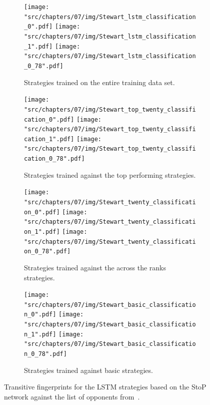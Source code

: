 \begin{figure}[!htbp]
    \begin{subfigure}{\textwidth}
        \texttt{[image: "src/chapters/07/img/Stewart\_lstm\_classification\_0".pdf]}
        \texttt{[image: "src/chapters/07/img/Stewart\_lstm\_classification\_1".pdf]}
        \texttt{[image: "src/chapters/07/img/Stewart\_lstm\_classification\_0\_78".pdf]}
        \caption{Strategies trained on the entire training data set.}
    \end{subfigure}
    \begin{subfigure}{\textwidth}
        \texttt{[image: "src/chapters/07/img/Stewart\_top\_twenty\_classification\_0".pdf]}
        \texttt{[image: "src/chapters/07/img/Stewart\_top\_twenty\_classification\_1".pdf]}
        \texttt{[image: "src/chapters/07/img/Stewart\_top\_twenty\_classification\_0\_78".pdf]}
        \caption{Strategies trained against the top performing strategies.}
    \end{subfigure}
    \begin{subfigure}{\textwidth}
        \texttt{[image: "src/chapters/07/img/Stewart\_twenty\_classification\_0".pdf]}
        \texttt{[image: "src/chapters/07/img/Stewart\_twenty\_classification\_1".pdf]}
        \texttt{[image: "src/chapters/07/img/Stewart\_twenty\_classification\_0\_78".pdf]}
        \caption{Strategies trained against the across the ranks strategies.}
    \end{subfigure}
    \begin{subfigure}{\textwidth}
        \texttt{[image: "src/chapters/07/img/Stewart\_basic\_classification\_0".pdf]}
        \texttt{[image: "src/chapters/07/img/Stewart\_basic\_classification\_1".pdf]}
        \texttt{[image: "src/chapters/07/img/Stewart\_basic\_classification\_0\_78".pdf]}
        \caption{Strategies trained against basic strategies.}
    \end{subfigure}
    \caption{Transitive fingerprints for the LSTM strategies based on the StoP
    network against the list of opponents from~\cite{Stewart2012}.}\label{fig:transitive_fingerprints_stewart_s_to_p}
\end{figure}

